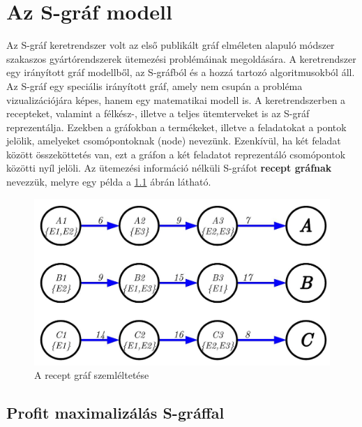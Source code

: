 \chapter{Az S-gráf modell}
Az S-gráf keretrendszer volt az első publikált gráf elméleten alapuló módszer szakaszos gyártórendszerek ütemezési problémáinak megoldására. \cite{Sanmarti2002}
A keretrendszer egy irányított gráf modellből, az S-gráfból és a hozzá tartozó algoritmusokból áll. \cite{SANMARTI1998S847}
Az S-gráf egy speciális irányított gráf, amely nem csupán a probléma vizualizációjára képes, hanem egy matematikai modell is.
A keretrendszerben a recepteket, valamint a félkész-, illetve a teljes ütemterveket is az S-gráf reprezentálja.
Ezekben a gráfokban a termékeket, illetve a feladatokat a pontok jelölik, amelyeket csomópontoknak (node) nevezünk.
Ezenkívül, ha két feladat között összeköttetés van, ezt a gráfon a két feladatot reprezentáló csomópontok közötti nyíl jelöli.
Az ütemezési információ nélküli S-gráfot \textbf{recept gráfnak} nevezzük, melyre egy példa a \ref{recipeGraph} ábrán látható.
\begin{figure}[H]
\begin{center}
\includegraphics[scale=0.35]{recipeGraph}
\caption{A recept gráf szemléltetése}
\label{recipeGraph}
\end{center}
\end{figure}
\section{Profit maximalizálás S-gráffal} \label{SgraphProfitMax}